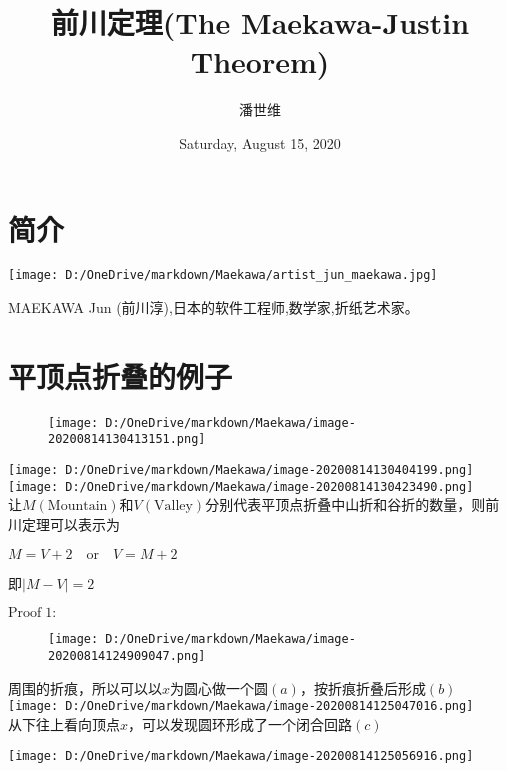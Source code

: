 \documentclass[a4paper,12pt]{article}
\begin{document}
\title {前川定理(The Maekawa-Justin Theorem)}
\author{潘世维}
\date{Saturday, August 15, 2020}
\maketitle
\section{简介} 
\texttt{[image: D:/OneDrive/markdown/Maekawa/artist\_jun\_maekawa.jpg]}

MAEKAWA Jun (前川淳),日本的软件工程师,数学家,折纸艺术家。

\section{平顶点折叠的例子}  

\begin{figure}[h]
    \centering
    \texttt{[image: D:/OneDrive/markdown/Maekawa/image-20200814130413151.png]}
\end{figure}

\texttt{[image: D:/OneDrive/markdown/Maekawa/image-20200814130404199.png]}\\
\texttt{[image: D:/OneDrive/markdown/Maekawa/image-20200814130423490.png]}\\


让$M(\text{Mountain})$和$V(\text{Valley})$分别代表平顶点折叠中山折和谷折的数量，则前川定理可以表示为

$M = V +2 \quad \text{or}\quad V = M + 2$

即$|M-V|=2$

$\text{Proof}\;1:$
\begin{figure}[h]
\centering
\texttt{[image: D:/OneDrive/markdown/Maekawa/image-20200814124909047.png]}
\end{figure}

周围的折痕，所以可以以$x$为圆心做一个圆$(a)$，按折痕折叠后形成$(b)$\\

\centering
\texttt{[image: D:/OneDrive/markdown/Maekawa/image-20200814125047016.png]}\\



从下往上看向顶点$x$，可以发现圆环形成了一个闭合回路$(c)$

\begin{center}
    \texttt{[image: D:/OneDrive/markdown/Maekawa/image-20200814125056916.png]}
\end{center}
\end{document}

